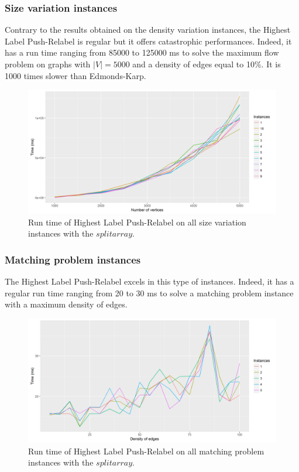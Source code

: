 \subsubsection{Size variation instances}
Contrary to the results obtained on the density variation instances, the Highest Label Push-Relabel is regular but it offers catastrophic performances. Indeed, it has a run time ranging from 85000 to 125000 ms to solve the maximum flow problem on graphs with $|V|=5000$ and a density of edges equal to 10\%. It is 1000 times slower than Edmonds-Karp.
\begin{figure}[H]
\begin{center}
\includegraphics[scale=0.44]{images/results/HLPRmean.png}
\caption{Run time of Highest Label Push-Relabel on all size variation instances with the $split array$.}
\label{fig:HLPRmean}
\end{center}
\end{figure}
\subsubsection{Matching problem instances}
The Highest Label Push-Relabel excels in this type of instances. Indeed, it has a regular run time ranging from 20 to 30 ms to solve a matching problem instance with a maximum density of edges.
\begin{figure}[H]
\begin{center}
\includegraphics[scale=0.44]{images/results/prmatching.png}
\caption{Run time of Highest Label Push-Relabel on all matching problem instances with the $split array$.}
\label{fig:prmatching}
\end{center}
\end{figure}

